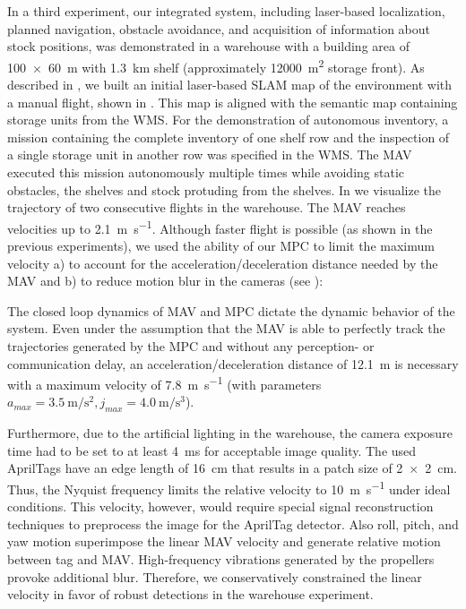 In a third experiment, our integrated system, including laser-based localization, planned navigation, obstacle avoidance, and acquisition of information about stock positions, was demonstrated in a warehouse with a building area of \SI[product-units = single]{100 x 60}{\meter} with \SI{1.3}{\kilo\meter} shelf (approximately \SI{12000}{\meter\squared} storage front).
As described in , we built an initial laser-based SLAM map of the environment with a manual flight, shown in .
This map is aligned with the semantic map containing storage units from the WMS.
For the demonstration of autonomous inventory, a mission containing the complete inventory of one shelf row and the inspection of a single storage unit in another row was specified in the WMS.
The MAV executed this mission autonomously multiple times while avoiding static obstacles, \eg the shelves and stock protuding from the shelves.
In  we visualize the trajectory of two consecutive flights in the warehouse. The MAV reaches velocities up to \SI{2.1}{\meter\per\second}.
Although faster flight is possible (as shown in the previous experiments), we used the ability of our MPC to limit the maximum velocity a) to account for the acceleration/deceleration distance needed by the MAV and b) to reduce motion blur in the cameras (see ):

The closed loop dynamics of MAV and MPC dictate the dynamic behavior of the system. Even under the assumption that the MAV is able to perfectly track the trajectories generated by the MPC and without any perception- or communication delay, an acceleration/deceleration distance of \SI{12.1}{\meter} is necessary with a maximum velocity of \SI{7.8}{\meter\per\second} (with parameters $a_{max} = \SI{3.5}{\meter\per\second\squared}, j_{max} = \SI{4.0}{\meter\per\second\cubed}$).

Furthermore, due to the artificial lighting in the warehouse, the camera exposure time had to be set to at least \SI{4}{\milli\second} for acceptable image quality. The used AprilTags have an edge length of \SI{16}{\centi\meter} that results in a patch size of \SI[product-units = single]{2 x 2}{\centi\meter}. Thus, the Nyquist frequency limits the relative velocity to \SI{10}{\meter\per\second} under ideal conditions. This velocity, however, would require special signal reconstruction techniques to preprocess the image for the AprilTag detector.
Also roll, pitch, and yaw motion superimpose the linear MAV velocity and generate relative motion between tag and MAV.
High-frequency vibrations generated by the propellers provoke additional blur. Therefore, we conservatively constrained the linear velocity in favor of robust detections in the warehouse experiment.

